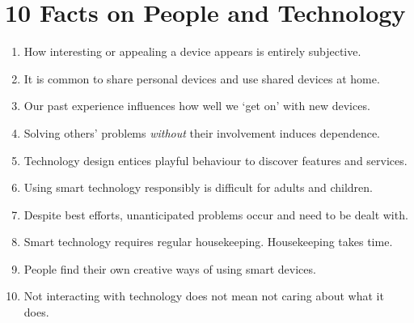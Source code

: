 \documentclass[10pt,nocombine]{leaflet}
\begin{document}
\section{10 Facts on People and Technology}
\vfill
\begin{onehalfspacing}
\begin{enumerate}[label=\Large\protect\Circled{\bfseries\normalsize\arabic*},labelsep=10pt,leftmargin=40pt]
    \item \large How interesting or appealing a device appears is entirely subjective.\vspace{1ex}
    \item \large It is common to share personal devices and use shared devices at home.\vspace{1ex}
    \item \large Our past experience influences how well we `get on' with new devices.\vspace{1ex}
    \item \large Solving others' problems \textit{without} their involvement induces dependence.\vspace{1ex}
    \item \large Technology design entices playful behaviour to discover features and services.\vspace{1ex}
    \item \large Using smart technology responsibly is difficult for adults and children.\vspace{1ex}
    \item \large Despite best efforts, unanticipated problems occur and need to be dealt with.\vspace{1ex}
    \item \large Smart technology requires regular housekeeping. Housekeeping takes time.\vspace{1ex}
    \item \large People find their own creative ways of using smart devices.\vspace{1ex}
    \item \large Not interacting with technology does not mean not caring about what it does.
\end{enumerate}
\end{onehalfspacing}
\vfill

\clearpage
\end{document}
